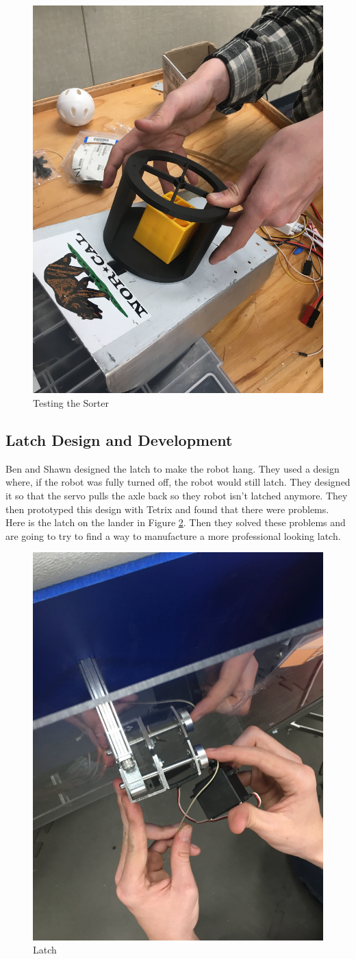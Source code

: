 \documentclass{article}
\begin{document}
\begin{figure}
    \centering
    \includegraphics[width=.6 \textwidth]{13_11-26/images/sorting.JPG}
    \caption{Testing the Sorter}
    \label{fig:sortertesting}
\end{figure}

\subsection{Latch Design and Development}
Ben and Shawn designed the latch to make the robot hang. They used a design where, if the robot was fully turned off, the robot would still latch. They designed it so that the servo pulls the axle back so they robot isn't latched anymore. They then prototyped this design with Tetrix and found that there were problems. Here is the latch on the lander in Figure \ref{fig:latch1}. Then they solved these problems and are going to try to find a way to manufacture a more professional looking latch.

\begin{figure}
    \centering
    \includegraphics[width=.6 \textwidth]{13_11-26/images/latchservo.JPG}
    \caption{Latch}
    \label{fig:latch1}
\end{figure}
\end{document}
